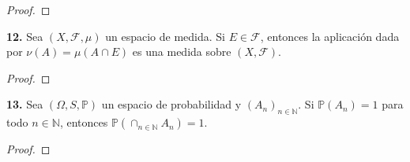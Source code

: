 \documentclass{article}
\newenvironment{statement}[1]{\smallskip\noindent\color[rgb]{1.00,0.00,0.50} {\bf #1.}}{}
\theoremstyle{definition}
\theoremstyle{remark}
\newcommand{\BN}{\mathbb N}
\begin{document}
\begin{proof}
\end{proof}

\begin{statement}{12}
  Sea $(X, \mathcal{F}, \mu)$ un espacio de medida. Si $E \in \mathcal{F}$, entonces la aplicaci\'on dada por $\nu(A) = \mu(A \cap E)$ es una medida sobre $(X, \mathcal{F})$.
\end{statement}

\begin{proof}
\end{proof}

\begin{statement}{13}
  Sea $(\Omega, S, \mathbb{P})$ un espacio de probabilidad y $(A_n)_{n \in \BN}$. Si $\mathbb{P}(A_n) = 1$ para todo $n \in \BN$, entonces $\mathbb{P}(\cap_{n \in \BN} A_n) = 1$.
\end{statement}

\begin{proof}
\end{proof}
\end{document}
